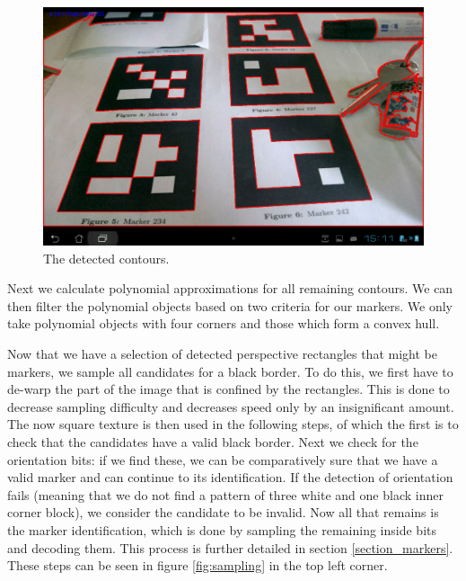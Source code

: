 \begin{figure}[H]
	\centering
	\includegraphics[width=14cm]{img/contours.png}
	\caption[Contour Detection]{The detected contours.}
	\label{fig:contours}
\end{figure}

Next we calculate polynomial approximations for all remaining contours.
We can then filter the polynomial objects based on two criteria for our markers.
We only take polynomial objects with four corners and those which form a convex hull.

Now that we have a selection of detected perspective rectangles that might be markers, we sample all candidates for a black border.
To do this, we first have to de-warp the part of the image that is confined by the rectangles.
This is done to decrease sampling difficulty and decreases speed only by an insignificant amount.
The now square texture is then used in the following steps, of which the first is to check that the candidates have a valid black border.
Next we check for the orientation bits: if we find these, we can be comparatively sure that we have a valid marker and can continue to its identification.
If the detection of orientation fails (meaning that we do not find a pattern of three white and one black inner corner block), we consider the candidate to be invalid.
Now all that remains is the marker identification, which is done by sampling the remaining inside bits and decoding them.
This process is further detailed in section \ref{section_markers}.
These steps can be seen in figure \ref{fig:sampling} in the top left corner.

